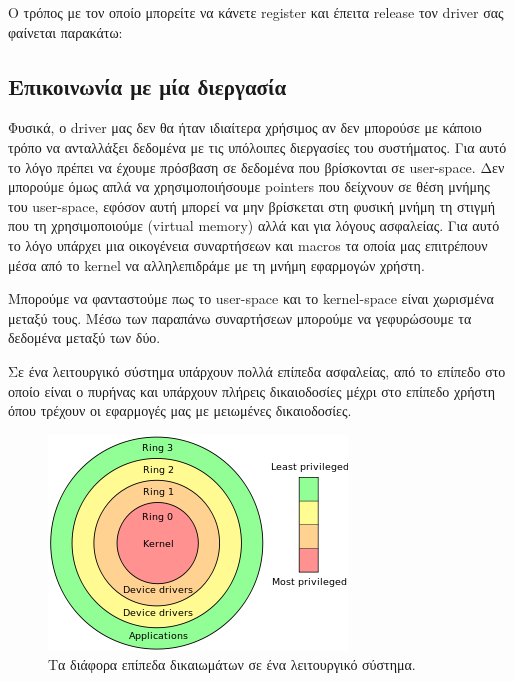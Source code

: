 \documentclass[18pt]{extarticle}
\begin{document}
Ο τρόπος με τον οποίο μπορείτε να κάνετε register και έπειτα release τον driver σας φαίνεται παρακάτω:

\begin{file}
        
\end{file}

\subsection{Επικοινωνία με μία διεργασία}

Φυσικά, ο driver μας δεν θα ήταν ιδιαίτερα χρήσιμος αν δεν μπορούσε με κάποιο τρόπο να ανταλλάξει δεδομένα με τις υπόλοιπες διεργασίες του συστήματος. 
Για αυτό το λόγο πρέπει να έχουμε πρόσβαση σε δεδομένα που βρίσκονται σε user-space.
Δεν μπορούμε όμως απλά να χρησιμοποιήσουμε pointers που δείχνουν σε θέση μνήμης
του user-space, εφόσον αυτή μπορεί να μην βρίσκεται στη φυσική μνήμη τη στιγμή
που τη χρησιμοποιούμε (virtual memory) αλλά και για λόγους ασφαλείας.
Για αυτό το λόγο υπάρχει μια οικογένεια συναρτήσεων και macros τα οποία μας επιτρέπουν μέσα από το kernel να αλληλεπιδράμε με τη μνήμη εφαρμογών χρήστη.

\begin{file}
        
\end{file}

Μπορούμε να φανταστούμε πως το user-space και το kernel-space είναι χωρισμένα μεταξύ τους.
Μέσω των παραπάνω συναρτήσεων μπορούμε να γεφυρώσουμε τα δεδομένα μεταξύ των δύο.

Σε ένα λειτουργικό σύστημα υπάρχουν πολλά επίπεδα ασφαλείας, από το επίπεδο στο οποίο είναι ο πυρήνας
και υπάρχουν πλήρεις δικαιοδοσίες μέχρι στο επίπεδο χρήστη όπου τρέχουν οι εφαρμογές μας με μειωμένες 
δικαιοδοσίες.

\begin{figure}[htpb]
    \centering
    \includegraphics[width=.5\textwidth]{assets/prings.png}
    \caption{Τα διάφορα επίπεδα δικαιωμάτων σε ένα λειτουργικό σύστημα.}
    \label{fig:prings}
\end{figure}
\end{document}
